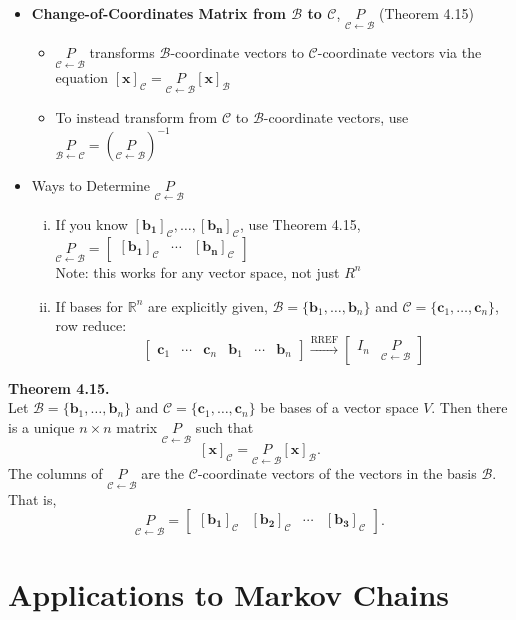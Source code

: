 \documentclass[10pt]{book}
\newenvironment{boxthm}{\begin{mdframed}[backgroundcolor=gray!30,nobreak=true]}{\end{mdframed}}
\newcommand{\R}{\mathbb{R}}
\newcommand{\B}{\mathscr{B}}
\newcommand{\C}{\mathscr{C}}
\newcommand{\vect}[1]{\ensuremath{\boldsymbol{\mathbf{#1}}}}
\newcommand{\vectset}[3][v]{\{\vect{#1}_{#2},\ldots,\vect{#1}_{#3}\}}
\newcommand{\vectB}[1][x]{[\vect{#1}]_\B}
\newcommand{\vectC}[1][x]{[\vect{#1}]_\C}
\newcommand{\CoC}[2]{\underset{#2\leftarrow #1}{P}}
\begin{document}
\begin{itemize}
	\item \textbf{Change-of-Coordinates Matrix from $\boldsymbol{\B}$ to $\boldsymbol{\C}$}, $\CoC{\B}{\C}$ (Theorem 4.15)
	\begin{itemize}
		\item $\CoC{\B}{\C}$ transforms $\B$-coordinate vectors to $\C$-coordinate vectors via the equation $\vectC[x]=\CoC{\B}{\C}\vectB[x]$
		\item To instead transform from $\C$ to $\B$-coordinate vectors, use $\CoC{\C}{\B} = \left(\CoC{\B}{\C}\right)^{-1}$
	\end{itemize}
	\item Ways to Determine $\CoC{\B}{\C}$
		\begin{enumerate}[(i)]
			\item If you know $\vectC[b_1],\ldots,\vectC[b_n]$, use Theorem 4.15, $\CoC{\B}{\C}=\begin{bmatrix}\vectC[b_1]&\cdots&\vectC[b_n]\end{bmatrix}$ \\ Note: this works for any vector space, not just $R^n$
			\item If bases for $\R^n$ are explicitly given, $\B=\vectset[b]{1}{n}$ and $\C=\vectset[c]{1}{n}$, row reduce:
			$$\begin{bmatrix}\vect{c}_1&\cdots&\vect{c}_n&\vect{b}_1&\cdots&\vect{b}_n\end{bmatrix} \xrightarrow{\text{RREF}} \begin{bmatrix}I_n&\CoC{\B}{\C}\end{bmatrix}$$
		\end{enumerate}
\end{itemize}

\begin{boxthm}
	\textbf{Theorem 4.15.} \\
	Let $\B=\vectset[b]{1}{n}$ and $\C=\vectset[c]{1}{n}$ be bases of a vector space $V$. Then there is a unique $n\times n$ matrix $\CoC{\B}{\C}$ such that
	$$ \vectC = \CoC{\B}{\C}\vectB. $$
	The columns of $\CoC{\B}{\C}$ are the $\C$-coordinate vectors of the vectors in the basis $\B$. That is,
	$$ \CoC{\B}{\C} = \begin{bmatrix}\vectC[b_1]&\vectC[b_2]&\cdots&\vectC[b_3]\end{bmatrix}.$$
\end{boxthm}


\newpage


\setcounter{section}{8}
\section{Applications to Markov Chains}
\end{document}
